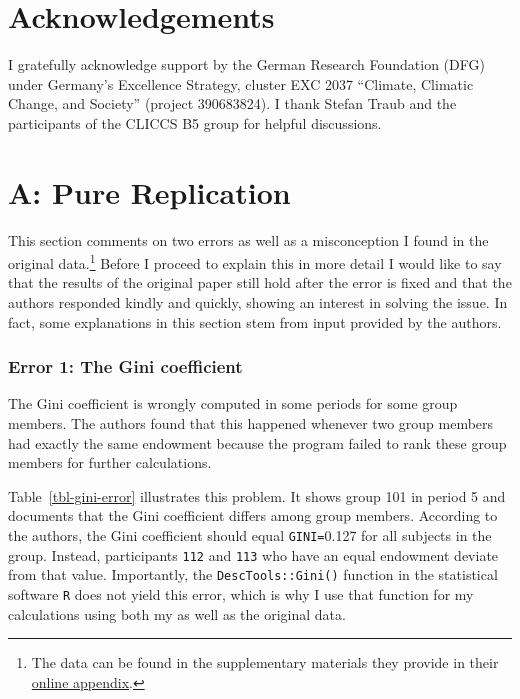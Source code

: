 \documentclass[
  authoryear,
  review,
  3p,
  onecolumn]{elsarticle}
\begin{document}
\hypertarget{acknowledgements}{%
\section{Acknowledgements}\label{acknowledgements}}

I gratefully acknowledge support by the German Research Foundation (DFG)
under Germany's Excellence Strategy, cluster EXC 2037 ``Climate,
Climatic Change, and Society'' (project 390683824). I thank Stefan Traub
and the participants of the CLICCS B5 group for helpful discussions.

\newpage{}

\hypertarget{a-pure-replication}{%
\section{A: Pure Replication}\label{a-pure-replication}}

This section comments on two errors as well as a misconception I found
in the original data.\footnote{The data can be found in the
  supplementary materials they provide in their
  \href{https://www.sciencedirect.com/science/article/pii/S0047272717300361\#s0115}{online
  appendix}.} Before I proceed to explain this in more detail I would
like to say that the results of the original paper still hold after the
error is fixed and that the authors responded kindly and quickly,
showing an interest in solving the issue. In fact, some explanations in
this section stem from input provided by the authors.

\hypertarget{error-1-the-gini-coefficient}{%
\subsubsection{Error 1: The Gini
coefficient}\label{error-1-the-gini-coefficient}}

The Gini coefficient is wrongly computed in some periods for some group
members. The authors found that this happened whenever two group members
had exactly the same endowment because the program failed to rank these
group members for further calculations.

Table~\ref{tbl-gini-error} illustrates this problem. It shows group 101
in period 5 and documents that the Gini coefficient differs among group
members. According to the authors, the Gini coefficient should equal
\texttt{GINI=}0.127 for all subjects in the group. Instead, participants
\texttt{112} and \texttt{113} who have an equal endowment deviate from
that value. Importantly, the \texttt{DescTools::Gini()} function in the
statistical software \texttt{R} does not yield this error, which is why
I use that function for my calculations using both my as well as the
original data.
\end{document}
